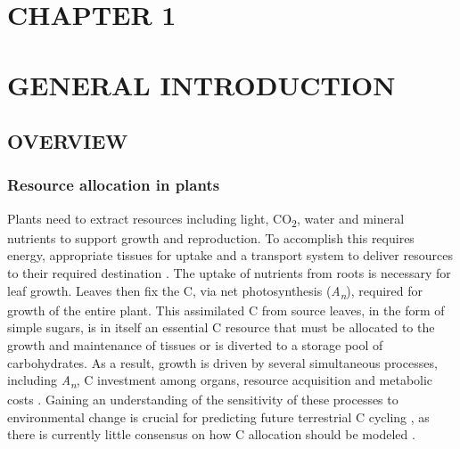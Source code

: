 \documentclass[a4paper]{article}\usepackage[]{graphicx}\usepackage[]{color}
\begin{document}
\clearpage
\section*{CHAPTER 1 \\ \mbox{ }\\ GENERAL INTRODUCTION}
\subsection*{OVERVIEW}

\subsubsection*{Resource allocation in plants}
Plants need to extract resources including light, CO\textsubscript{2}, water and mineral nutrients to support growth and reproduction. To accomplish this requires energy, appropriate tissues for uptake and a transport system to deliver resources to their required destination \citep{grace1997allocation}. The uptake of nutrients from roots is necessary for leaf growth. Leaves then fix the C, via net photosynthesis (\textit{A\textsubscript{n}}), required for growth of the entire plant. This assimilated C from source leaves, in the form of simple sugars, is in itself an essential C resource that must be allocated to the growth and maintenance of tissues or is diverted to a storage pool of carbohydrates. As a result, growth is driven by several simultaneous processes, including \textit{A\textsubscript{n}}, C investment among organs, resource acquisition and metabolic costs \citep{korner2006plant, fourcaud2008plant}. Gaining an understanding of the sensitivity of these processes to environmental change is crucial for predicting future terrestrial C cycling \citep{friedlingstein1999toward}, as there is currently little consensus on how C allocation should be modeled \citep{franklin2012modeling, de2014does}.
\end{document}
